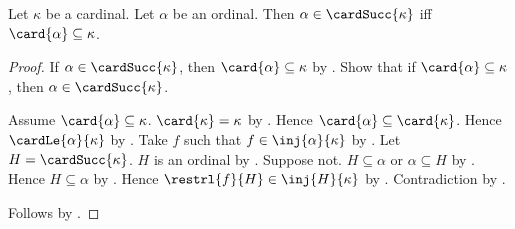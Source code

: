 \begin{theorem}\label{ordinal_below_cardinal_successor_iff}
    Let $\kappa$ be a cardinal.
    Let $\alpha$ be an ordinal.
    Then $\alpha\in\cardSucc{\kappa}$ iff
        $\card{\alpha}\subseteq\kappa$.
\end{theorem}
\begin{proof}
    If $\alpha\in\cardSucc{\kappa}$, then
        $\card{\alpha}\subseteq\kappa$
        by .
    Show that if $\card{\alpha}\subseteq\kappa$, then
        $\alpha\in\cardSucc{\kappa}$.
    \begin{subproof}
        Assume $\card{\alpha}\subseteq\kappa$.
        $\card{\kappa}=\kappa$ by .
        Hence $\card{\alpha}\subseteq\card{\kappa}$.
        Hence $\cardLe{\alpha}{\kappa}$
            by .
        Take $f$ such that $f\in\inj{\alpha}{\kappa}$
            by .
        Let $H=\cardSucc{\kappa}$.
        $H$ is an ordinal
            by .
        Suppose not.
        $H\subseteq\alpha$ or $\alpha\subseteq H$
            by .
        Hence $H\subseteq\alpha$
            by .
        Hence $\restrl{f}{H}\in\inj{H}{\kappa}$
            by .
        Contradiction by .
    \end{subproof}
    Follows by \auto.
\end{proof}
